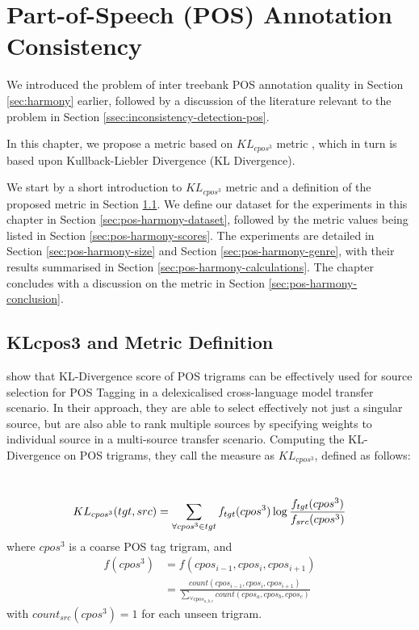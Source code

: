 \newpage

\chapter{Part-of-Speech (POS) Annotation Consistency}
\label{chap:pos-harmony}

We introduced the problem of inter treebank POS annotation quality in Section \ref{sec:harmony} earlier, followed by a discussion of the literature relevant to the problem in Section \ref{ssec:inconsistency-detection-pos}. 

In this chapter, we propose a metric based on \(KL_{cpos^3}\) metric \citep{klcpos3}, which in turn is based upon Kullback-Liebler Divergence (KL Divergence). 

We start by a short introduction to \(KL_{cpos^3}\) metric and a definition of the proposed metric in Section \ref{sec:pos-harmony-definition}. We define our dataset for the experiments in this chapter in Section \ref{sec:pos-harmony-dataset}, followed by the metric values being listed in Section \ref{sec:pos-harmony-scores}. The experiments are detailed in Section \ref{sec:pos-harmony-size} and Section \ref{sec:pos-harmony-genre}, with their results summarised in Section \ref{sec:pos-harmony-calculations}. The chapter concludes with a discussion on the metric in Section \ref{sec:pos-harmony-conclusion}.

\section{KLcpos3 and Metric Definition}
\label{sec:pos-harmony-definition}

\cite{klcpos3} show that KL-Divergence score of POS trigrams can be effectively used for source selection for POS Tagging in a delexicalised cross-language model transfer scenario. In their approach, they are able to select effectively not just a singular source, but are also able to rank multiple sources by specifying weights to individual source in a multi-source transfer scenario. Computing the KL-Divergence on POS trigrams, they call the measure as \(KL_{cpos^3}\), defined as follows:

\begin{definition}
\label{def:klcpos3}
\textbf{ }\\
\begin{equation}
\label{eqn:klcpos3}
\small KL_{cpos^3}(tgt, src) = \sum_{\forall cpos^3 \in tgt}^{}f_{tgt}(cpos^3)\log\frac{f_{tgt}(cpos^3)}{f_{src}(cpos^3)}
\end{equation}
where \(cpos^3\) is a coarse POS tag trigram, and \\
\begin{align}
\label{eqn:cpos}
f(cpos^3) & = \nonumber f(cpos_{i-1}, cpos_{i}, cpos_{i+1}) \\ &= \frac{count(cpos_{i-1}, cpos_{i}, cpos_{i+1})}{\sum_{\forall cpos_{a,b,c}}{count(cpos_{a}, cpos_{b}, cpos_{c})}}
\end{align}
with \(count_{src}(cpos^3) = 1\) for each unseen trigram.
\end{definition}

